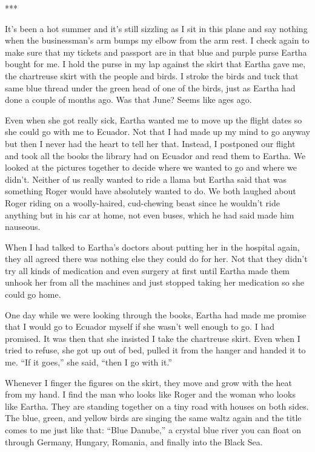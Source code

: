 \documentclass[twoside,10pt]{book}
\begin{document}
***

It's been a hot summer and it's still sizzling as I sit in this plane
and say nothing when the busi­nessman's arm bumps my elbow from the arm
rest. I check again to make sure that my tickets and passport are in
that blue and purple purse Eartha bought for me. I hold the purse in my
lap against the skirt that Eartha gave me, the chartreuse skirt with the
people and birds. I stroke the birds and tuck that same blue thread
under the green head of one of the birds, just as Eartha had done a
couple of months ago. Was that June? Seems like ages ago.

Even when she got really sick, Eartha wanted me to move up the flight
dates so she could go with me to Ecuador. Not that I had made up my mind
to go anyway but then I never had the heart to tell her that. Instead, I
postponed our flight and took all the books the library had on Ecuador
and read them to Eartha. We looked at the pictures together to decide
where we wanted to go and where we didn't. Neither of us really wanted
to ride a llama but Eartha said that was something Roger would have
absolutely wanted to do. We both laughed about Roger riding on a
woolly-haired, cud-chewing beast since he wouldn't ride anything but in
his car at home, not even buses, which he had said made him nauseous.

When I had talked to Eartha's doctors about putting her in the hospital
again, they all agreed there was nothing else they could do for her. Not
that they didn't try all kinds of medication and even surgery at first
until Eartha made them unhook her from all the machines and just stopped
taking her medication so she could go home.

One day while we were looking through the books, Eartha had made me
promise that I would go to Ecuador myself if she wasn't well enough to
go. I had promised. It was then that she insisted I take the chartreuse
skirt. Even when I tried to refuse, she got up out of bed, pulled it
from the hanger and handed it to me. ``If it goes,'' she said, ``then I
go with it.''

Whenever I finger the figures on the skirt, they move and grow with the
heat from my hand. I find the man who looks like Roger and the woman who
looks like Eartha. They are standing together on a tiny road with houses
on both sides. The blue, green, and yellow birds are singing the same
waltz again and the title comes to me just like that: ``Blue Danube,'' a
crystal blue river you can float on through Germany, Hungary, Romania,
and finally into the Black Sea.
\end{document}
